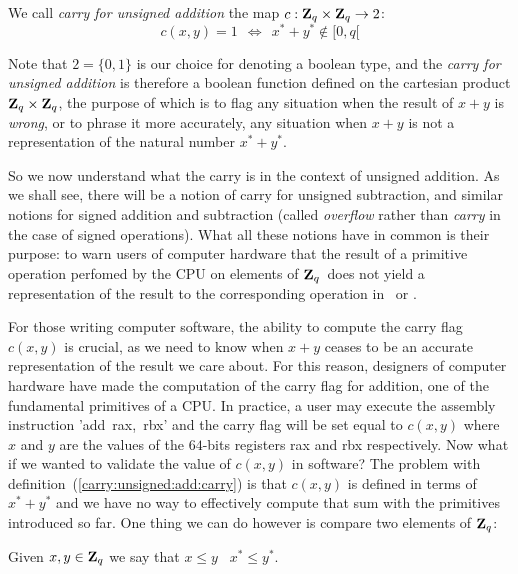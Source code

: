\documentclass{article}
\newcommand{\zq}{\mbox{${\bf Z}_{q}$}}
\begin{document}
\begin{defin}\label{carry:unsigned:add:carry}
We call {\em carry for unsigned addition} the map $c:\zq\times\zq\rightarrow2$:
  \[
    c(x,y) = 1  \ \ \Leftrightarrow\ \ x^{*} + y^{*} \not\in[0,q[
  \]
\end{defin}

Note that $2=\{0,1\}$ is our choice for denoting a boolean type, and the 
{\em carry for unsigned addition} is therefore a boolean function defined 
on the cartesian product $\zq\times\zq$, the purpose of which
is to flag any situation when the result of $x+y$ is {\em wrong}, or to
phrase it more accurately, any situation when $x+y$ is not a representation 
of the natural number $x^{*}+y^{*}$. 

So we now understand what the carry is in the context of unsigned addition.
As we shall see, there will be a notion of carry for unsigned subtraction, 
and similar notions for signed addition and subtraction (called {\em overflow} 
rather than {\em carry} in the case of signed operations). What all these 
notions have in common is their purpose: to warn users of computer hardware 
that the result of a primitive operation perfomed by the CPU on elements 
of \zq\ does not yield a representation of the result to the corresponding 
operation in \N\ or \Z.

For those writing computer software, the ability to compute the carry flag 
$c(x,y)$ is crucial, as we need to know when $x+y$ ceases to be an accurate 
representation of the result we care about. For this reason, designers of
computer hardware have made the computation of the carry flag for addition, 
one of the fundamental primitives of a CPU. In practice, a user may execute
the assembly instruction '\mbox{add rax, rbx}' and the carry flag will be set
equal to $c(x,y)$ where $x$ and $y$ are the values of the $64$-bits registers
{\rm rax} and {\rm rbx} respectively. Now what if we wanted to validate the
value of $c(x,y)$ in software? The problem with 
definition~(\ref{carry:unsigned:add:carry}) is that $c(x,y)$ is defined in
terms of $x^{*}+y^{*}$ and we have no way to effectively compute that
sum with the primitives introduced so far. One thing we can do however is
compare two elements of \zq:

\begin{defin}\label{carry:order:zq}
  Given $x,y\in\zq$ we say that $x\leq y$ \ifand\ $x^{*}\leq y^{*}$.
\end{defin}
\end{document}
